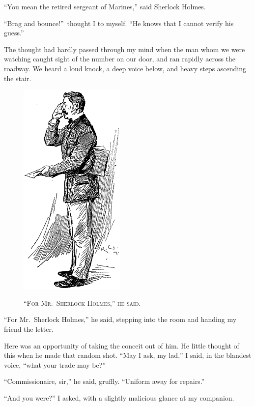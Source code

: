 \documentclass[12pt,english,oneside]{book}
\newcommand{\noun}[1]{\textsc{#1}}
\begin{document}
{}``You mean the retired sergeant of Marines,'' said Sherlock Holmes.

{}``Brag and bounce!''\ thought I to myself. {}``He knows that
I cannot verify his guess.''

The thought had hardly passed through my mind when the man whom we
were watching caught sight of the number on our door, and ran rapidly
across the roadway. We heard a loud knock, a deep voice below, and
heavy steps ascending the stair.

%
\begin{figure}[htbp]
\noindent \begin{center}\includegraphics{images/study10-stud-04.png}\end{center}

\noindent \begin{center}\noun{{}``For Mr.\ Sherlock Holmes,''
he said.}\end{center}
\end{figure}
{}``For Mr.\ Sherlock Holmes,'' he said, stepping into the room
and handing my friend the letter.

Here was an opportunity of taking the conceit out of him. He little
thought of this when he made that random shot. {}``May I ask, my
lad,'' I said, in the blandest voice, {}``what your trade may be?''

{}``Commissionaire, sir,'' he said, gruffly. {}``Uniform away for
repairs.''

{}``And you were?'' I asked, with a slightly malicious glance at
my companion.
\end{document}
